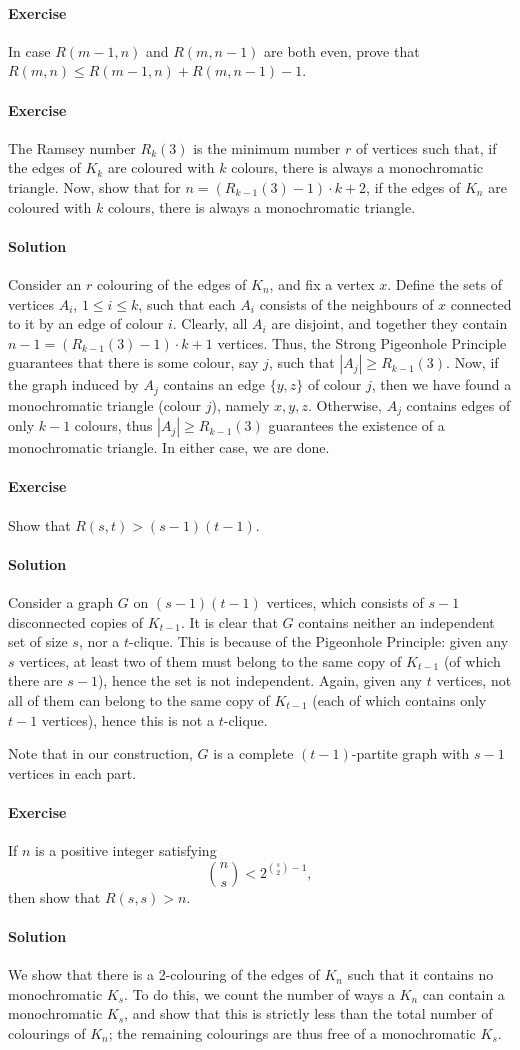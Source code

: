 \documentclass[10pt]{article}
\newcounter{prob}
\newcommand{\problem}{\stepcounter{prob}\paragraph{Exercise \arabic{prob}}}
\newcommand{\solution}{\paragraph{Solution}}
\begin{document}
    \problem In case $R(m - 1, n)$ and $R(m, n - 1)$ are both even, prove that $R(m,
    n) \leq R(m - 1, n) + R(m, n - 1) - 1$.

    \problem The Ramsey number $R_k(3)$ is the minimum number $r$ of vertices such
    that, if the edges of $K_k$ are coloured with $k$ colours, there is always a
    monochromatic triangle. Now, show that for $n = (R_{k - 1}(3) - 1) \cdot k + 2$,
    if the edges of $K_n$ are coloured with $k$ colours, there is always a
    monochromatic triangle.

    \solution Consider an $r$ colouring of the edges of $K_n$, and fix a vertex $x$.
    Define the sets of vertices $A_i$, $1 \leq i \leq k$, such that each $A_i$
    consists of the neighbours of $x$ connected to it by an edge of colour $i$.
    Clearly, all $A_i$ are disjoint, and together they contain $n - 1 = (R_{k - 1}(3)
    - 1) \cdot k + 1$ vertices. Thus, the Strong Pigeonhole Principle guarantees that
    there is some colour, say $j$, such that $|A_j| \geq R_{k - 1}(3)$. Now, if the
    graph induced by $A_j$ contains an edge $\{y, z\}$ of colour $j$, then we have
    found a monochromatic triangle (colour $j$), namely $x, y, z$. Otherwise, $A_j$
    contains edges of only $k - 1$ colours, thus $|A_j| \geq R_{k - 1}(3)$ guarantees
    the existence of a monochromatic triangle. In either case, we are done.

    \problem Show that $R(s, t) > (s - 1)(t - 1)$.

    \solution Consider a graph $G$ on $(s - 1)(t - 1)$ vertices, which consists of $s
    - 1$ disconnected copies of $K_{t - 1}$. It is clear that $G$ contains neither an
    independent set of size $s$, nor a $t$-clique. This is because of the Pigeonhole
    Principle: given any $s$ vertices, at least two of them must belong to the same
    copy of $K_{t - 1}$ (of which there are $s - 1$), hence the set is not
    independent. Again, given any $t$ vertices, not all of them can belong to the
    same copy of $K_{t - 1}$ (each of which contains only $t - 1$ vertices), hence
    this is not a $t$-clique.

    Note that in our construction, $G$ is a complete $(t - 1)$-partite graph with $s
    - 1$ vertices in each part.

    \problem If $n$ is a positive integer satisfying \[
        \binom{n}{s} < 2^{\binom{s}{2} - 1},
    \] then show that $R(s, s) > n$.

    \solution We show that there is a 2-colouring of the edges of $K_n$ such that it
    contains no monochromatic $K_s$. To do this, we count the number of ways a $K_n$
    can contain a monochromatic $K_s$, and show that this is strictly less than the
    total number of colourings of $K_n$; the remaining colourings are thus free of a
    monochromatic $K_s$.
\end{document}
